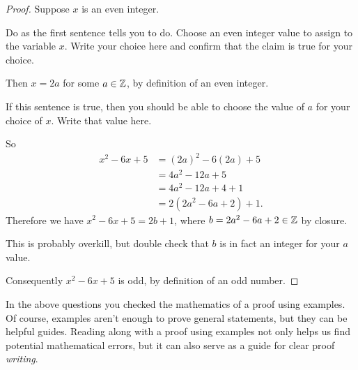 \begin{mdframed}[backgroundcolor=gray!10!]
\begin{proof}
Suppose $x$ is an even integer.  
\begin{mdframed}[backgroundcolor=white]
\begin{question}
\item  Do as the first sentence tells you to do.  Choose an even integer value to assign to the variable $x$.  Write your choice here and confirm that the claim is true for your choice.
\vspace{.5in}
\end{question}
\end{mdframed}

Then $x=2a$ for some $a \in \mathbb{Z}$, by definition of an even integer. 
\begin{mdframed}[backgroundcolor=white]
\begin{question}[start=2]
\item  If this sentence is true, then you should be able to choose the value of $a$ for your choice of $x$.  Write that value here.
\vspace{.25in}
\end{question}
\end{mdframed}
 So
\begin{align*}
	x^2-6x+5 &= (2a)^2-6(2a)+5\\
	 &= 4a^2-12a+5 \\
	 &= 4a^2-12a+4+1\\
	 &= 2(2a^2-6a+2)+1.
\end{align*}
Therefore we have $x^2-6x+5=2b+1$, where $b=2a^2-6a+2 \in \mathbb{Z}$ by closure. 
\begin{mdframed}[backgroundcolor=white]
\begin{question}[start=3]
\item  This is probably overkill, but double check that $b$ is in fact an integer for your $a$ value.
\vspace{.5in}
\end{question}
\end{mdframed}
 Consequently $x^2-6x+5$ is odd, by definition of an odd number.
\end{proof}
\end{mdframed}

In the above questions you checked the mathematics of a proof using examples.  Of course, examples aren't enough to prove general statements, but they can be helpful guides.  Reading along with a proof using examples not only helps us find potential mathematical errors, but it can also serve as a guide for clear proof \textit{writing}.  \\

